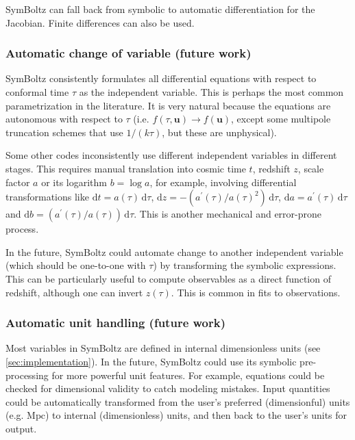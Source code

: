 \documentclass{aa}
\begin{document}
SymBoltz can fall back from symbolic to automatic differentiation for the Jacobian.
Finite differences can also be used.

\subsubsection{Automatic change of variable (future work)}
\label{sec:changeivar}

SymBoltz consistently formulates all differential equations with respect to conformal time $\tau$ as the independent variable.
This is perhaps the most common parametrization in the literature.
It is very natural because the equations are autonomous with respect to $\tau$ (i.e. $f(\tau,\boldsymbol{u}) \rightarrow f(\boldsymbol{u})$, except some multipole truncation schemes that use $1/(k\tau)$, but these are unphysical).

Some other codes inconsistently use different independent variables in different stages.
This requires manual translation into cosmic time $t$, redshift $z$, scale factor $a$ or its logarithm $b = \log a$, for example,
involving differential transformations like $\mathrm{d}t = a(\tau) \, \mathrm{d}\tau$, $\mathrm{d}z = -(a^\prime(\tau)/a(\tau)^2) \, \mathrm{d}\tau$, $\mathrm{d}a=a^\prime(\tau)\,\mathrm{d}\tau$ and $\mathrm{d}b = (a^\prime(\tau)/a(\tau))\,\mathrm{d}\tau$.
This is another mechanical and error-prone process.

In the future, SymBoltz could automate change to another independent variable (which should be one-to-one with $\tau$) by transforming the symbolic expressions.
This can be particularly useful to compute observables as a direct function of redshift, although one can invert $z(\tau)$.
This is common in fits to observations.

\subsubsection{Automatic unit handling (future work)}
\label{sec:units}

Most variables in SymBoltz are defined in internal dimensionless units (see \cref{sec:implementation}).
In the future, SymBoltz could use its symbolic pre-processing for more powerful unit features.
For example, equations could be checked for dimensional validity to catch modeling mistakes.
Input quantities could be automatically transformed from the user's preferred (dimensionful) units (e.g. $\text{Mpc}$) to internal (dimensionless) units, and then back to the user's units for output.
\end{document}
